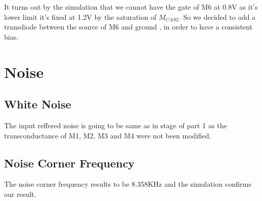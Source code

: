 It turns out by the simulation that we cannot have the gate of M6 at 0.8V as it's lower limit it's fixed at 1.2V by the saturation of $M_{CAS2}$.
So we decided to add a transdiode between the source of M6 and ground , in order to have a consistent bias.

\section{Noise} %
\label{sec:noise}


\subsection{White Noise} %
\label{sub:white_noise}

The input reffered noise is going to be same as in stage of part 1 as the transconductance of M1, M2, M3 and M4 were not been modified.

\subsection{Noise Corner Frequency} %
\label{sub:noise_corner_frequency}

The noise corner frequency results to be 8.358KHz and the simulation confirms our result.





